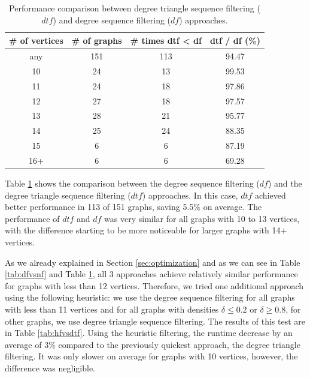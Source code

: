 \begin{table}
\begin{tabular}{ | c | c | c | c |}
\hline
\# of vertices & \# of graphs & \# times dtf < df & dtf / df (\%) \\
\hline
any & 151 & 113 & 94.47 \\
10 & 24 & 13 & 99.53 \\
11 & 24 & 18 & 97.86 \\
12 & 27 & 18 & 97.57 \\
13 & 28 & 21 & 95.77 \\
14 & 25 & 24 & 88.35 \\
15 & 6 & 6 & 87.19 \\
16+ & 6 & 6 & 69.28 \\
\hline
\end{tabular}
\caption{\label{tab:dtfvsdf} Performance comparison between degree triangle sequence filtering ($dtf$) and degree sequence filtering ($df$) approaches.}
\end{table}

Table \ref{tab:dtfvsdf} shows the comparison between the degree sequence filtering ($df$) and the degree triangle sequence filtering ($dtf$) approaches. In this case, $dtf$ achieved better performance in 113 of 151 graphs, saving 5.5\% on average. The performance of $dtf$ and $df$ was very similar for all graphs with 10 to 13 vertices, with the difference starting to be more noticeable for larger graphs with 14+ vertices.

As we already explained in Section \ref{sec:optimization} and as we can see in Table \ref{tab:dfvsnf} and Table \ref{tab:dtfvsdf}, all 3 approaches achieve relatively similar performance for graphs with less than 12 vertices. Therefore, we tried one additional approach using the following heuristic: we use the degree sequence filtering for all graphs with less than 11 vertices and for all graphs with densities $\delta \le 0.2$ or $\delta \ge 0.8$, for other graphs, we use degree triangle sequence filtering. The results of this test are in Table \ref{tab:hfvsdtf}. Using the heuristic filtering, the runtime decrease by an average of 3\% compared to the previously quickest approach, the degree triangle filtering. It was only slower on average for graphs with 10 vertices, however, the difference was negligible.

